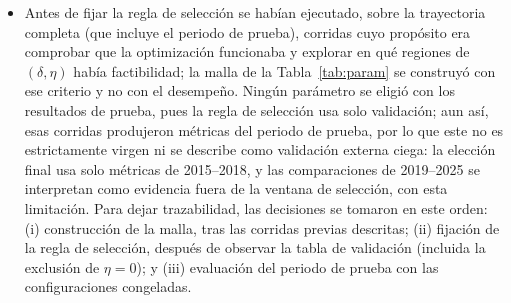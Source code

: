 \begin{itemize}
    \item Antes de fijar la regla de selección se habían ejecutado, sobre la trayectoria completa (que incluye el periodo de prueba), corridas cuyo propósito era comprobar que la optimización funcionaba y explorar en qué regiones de $(\delta,\eta)$ había factibilidad; la malla de la Tabla~\ref{tab:param} se construyó con ese criterio y no con el desempeño. Ningún parámetro se eligió con los resultados de prueba, pues la regla de selección usa solo validación; aun así, esas corridas produjeron métricas del periodo de prueba, por lo que este no es estrictamente virgen ni se describe como validación externa ciega: la elección final usa solo métricas de 2015--2018, y las comparaciones de 2019--2025 se interpretan como evidencia fuera de la ventana de selección, con esta limitación. Para dejar trazabilidad, las decisiones se tomaron en este orden: (i) construcción de la malla, tras las corridas previas descritas; (ii) fijación de la regla de selección, después de observar la tabla de validación (incluida la exclusión de $\eta=0$); y (iii) evaluación del periodo de prueba con las configuraciones congeladas.
\end{itemize}
